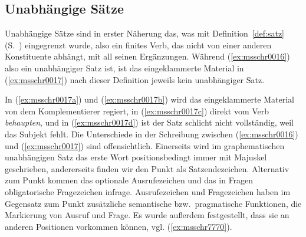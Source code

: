 \subsection{Unabhängige Sätze}

\label{sec:hauptsatzschreib}

Unabhängige Sätze sind in erster Näherung das, was mit Definition~\ref{def:satz} (S.~\pageref{def:satz}) eingegrenzt wurde, also ein finites Verb, das nicht von einer anderen Konstituente abhängt, mit all seinen Ergänzungen.
Während (\ref{ex:msschr0016}) also ein unabhängiger Satz ist, ist das eingeklammerte Material in (\ref{ex:msschr0017}) nach dieser Definition jeweils kein unabhängiger Satz.

\begin{exe}
  \ex\label{ex:msschr0017}
  \begin{xlist}
  \end{xlist}
\end{exe}

In (\ref{ex:msschr0017a}) und (\ref{ex:msschr0017b}) wird das eingeklammerte Material von dem Komplementierer regiert, in (\ref{ex:msschr0017c}) direkt vom Verb \textit{behaupten}, und in (\ref{ex:msschr0017d}) ist der Satz schlicht nicht vollständig, weil das Subjekt fehlt.
Die Unterschiede in der Schreibung zwischen (\ref{ex:msschr0016}) und (\ref{ex:msschr0017}) sind offensichtlich.
Einerseits wird im graphematischen unabhängigen Satz das erste Wort positionsbedingt immer mit Majuskel geschrieben, andererseits finden wir den Punkt als Satzendezeichen.
Alternativ zum Punkt kommen das optionale Ausrufezeichen und das in Fragen obligatorische Fragezeichen infrage.
Ausrufezeichen und Fragezeichen haben im Gegensatz zum Punkt zusätzliche semantische bzw.\ pragmatische Funktionen, \zB die Markierung von Ausruf und Frage.
Es wurde außerdem festgestellt, dass sie an anderen Positionen vorkommen können, vgl. (\ref{ex:msschr7770}).

\begin{exe}
  \ex\label{ex:msschr7770}
  \begin{xlist}
  \end{xlist}
\end{exe}


